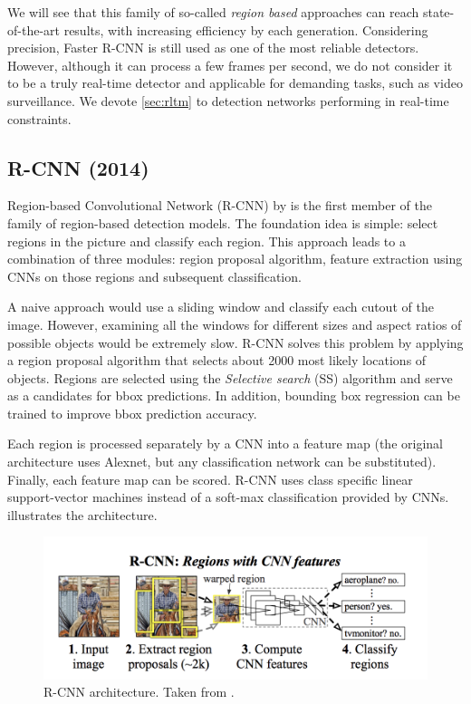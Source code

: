 We will see that this family of so-called \textit{region based} approaches can reach state-of-the-art results, with increasing efficiency by each generation. Considering precision, Faster R-CNN is still used as one of the most reliable detectors. However, although it can process a few frames per second, we do not consider it to be a truly real-time detector and applicable for demanding tasks, such as video surveillance. We devote \cref{sec:rltm} to detection networks performing in real-time constraints.

\subsection{R-CNN (2014)}
Region-based Convolutional Network (R-CNN) by \citeauthor{bib:rcnn} \cite{bib:rcnn} is the first member of the family of region-based detection models. The foundation idea is simple: select regions in the picture and classify each region. This approach leads to a combination of three modules: region proposal algorithm, feature extraction using CNNs on those regions and subsequent classification. 

A naive approach would use a sliding window and classify each cutout of the image. However, examining all the windows for different sizes and aspect ratios of possible objects would be extremely slow. R-CNN solves this problem by applying a region proposal algorithm that selects about 2000 most likely locations of objects. Regions are selected using the \textit{Selective search} (SS) \cite{bib:selectivesearch} algorithm and serve as a candidates for bbox predictions. In addition, bounding box regression can be trained to improve bbox prediction accuracy.

Each region is processed separately by a CNN into a feature map (the original architecture uses Alexnet, but any classification network can be substituted). Finally, each feature map can be scored. R-CNN uses class specific linear support-vector machines instead of a soft-max classification provided by CNNs.  illustrates the architecture.

\begin{figure}
    \centering
    \includegraphics[width=\textwidth]{img/rcnn}
    \caption[R-CNN architecture]%
    {R-CNN architecture. Taken from \cite[fig. 1]{bib:rcnn}.}
    \label{fig:rcnn}
\end{figure}

